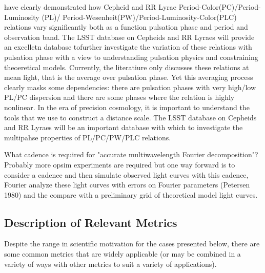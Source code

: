 \citet[and references therein]{2014MNRAS.445.2655B,2015MNRAS.447.3342B} have
clearly demonstrated how Cepheid and RR Lyrae
Period-Color(PC)/Period-Luminosity (PL)/
Period-Wesenheit(PW)/Period-Luminosity-Color(PLC) relations vary significantly
both as a function pulsation phase and period and observation band.  The LSST
database on Cepheids and RR Lyraes will provide an excelletn database tofurther
investigate the variation of these relations with pulsation phase with a view
to understanding pulsation physics and constraining theoeretical models.
Currently, the literatiure only discusses these relations at mean light, that
is the average over pulsation phase. Yet this averaging process clearly masks
some dependencies: there are pulsation phases with very high/low PL/PC
dispersion and there are some phases where the relation is highly nonlinear.
In the era of precision cosmology, it is important to understand the tools that
we use to construct a distance scale. The LSST database on Cepheids and RR
Lyraes will be an important database with which to investigate the multipahse
properties of PL/PC/PW/PLC relations.

What cadence is required for "accurate multiwavelength Fourier decomposition"? 
Probably more opsim experiments are required but one way forward is to consider a cadence and then simulate observed light curves with this 
cadence, Fourier analyze these light curves with errors on Fourier parameters (Petersen 1980) and the compare with a preliminary grid
of theoretical model light curves.



\subsection{Description of Relevant Metrics}
\label{sec:\chpname:variablemetrics}

Despite the range in scientific motivation for the cases presented below, there are some common metrics that are widely applicable (or may be combined in a variety of ways with other metrics to suit a variety of applications).


